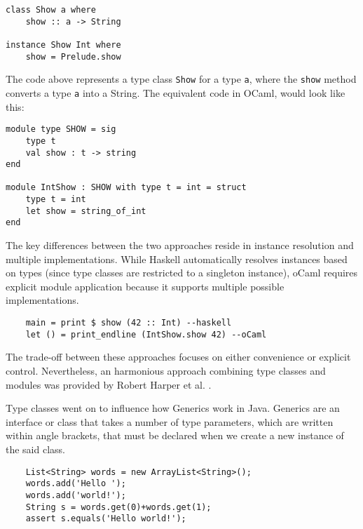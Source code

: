 \begin{lstlisting}
class Show a where
    show :: a -> String

instance Show Int where
    show = Prelude.show
\end{lstlisting}

The code above represents a type class \lstinline|Show| for a type \lstinline|a|, where the \lstinline|show| method converts a type \lstinline|a| into a String. The equivalent code in OCaml, would look like this:
\begin{lstlisting}
module type SHOW = sig
    type t
    val show : t -> string
end

module IntShow : SHOW with type t = int = struct
    type t = int
    let show = string_of_int
end
\end{lstlisting}

The key differences between the two approaches reside in instance resolution and multiple implementations. While Haskell automatically resolves instances based on types (since type classes are restricted to a singleton instance), oCaml requires explicit module application because it supports multiple possible implementations.

\begin{lstlisting}
    main = print $ show (42 :: Int) --haskell
    let () = print_endline (IntShow.show 42) --oCaml
\end{lstlisting}

The trade-off between these approaches focuses on either convenience or explicit control. Nevertheless, an harmonious approach combining type classes and modules was provided by Robert Harper et al. .


Type classes went on to influence how Generics work in Java. Generics are an interface or class that takes a number of type parameters, which are written within angle brackets, that must be declared when we create a new instance of the said class.

\begin{lstlisting}
    List<String> words = new ArrayList<String>();
    words.add('Hello ');
    words.add('world!');
    String s = words.get(0)+words.get(1);
    assert s.equals('Hello world!');
\end{lstlisting}


